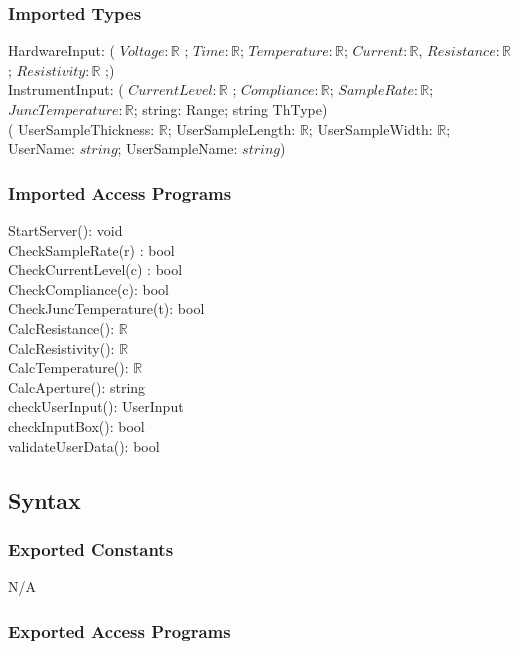 \documentclass[12pt, titlepage]{article}
\begin{document}
\subsubsection{Imported Types}

HardwareInput:
( $Voltage: \mathbb{R} $ ; $Time: \mathbb{R}$; $Temperature: \mathbb{R}$; $Current: \mathbb{R}$, $Resistance: \mathbb{R} $ ; $Resistivity: \mathbb{R} $ ;)\\

\noindent InstrumentInput:
( $CurrentLevel: \mathbb{R} $ ; $Compliance: \mathbb{R}$; $SampleRate: \mathbb{R}$; $JuncTemperature: \mathbb{R}$; string: Range; string ThType)\\

( UserSampleThickness: $\mathbb{R}$; UserSampleLength: $\mathbb{R}$; UserSampleWidth: $\mathbb{R}$; UserName: $string$; UserSampleName: $string$)

\subsubsection{Imported Access Programs}

StartServer(): void\\
CheckSampleRate(r) : bool\\
CheckCurrentLevel(c) : bool  \\
CheckCompliance(c): bool \\
CheckJuncTemperature(t): bool\\
CalcResistance(): $\mathbb{R}$ \\
CalcResistivity(): $\mathbb{R}$ \\
CalcTemperature(): $\mathbb{R}$ \\
CalcAperture(): string \\
checkUserInput(): UserInput\\
checkInputBox(): bool \\
validateUserData(): bool \\


\subsection{Syntax}

\subsubsection{Exported Constants}
N/A

\subsubsection{Exported Access Programs}
\end{document}
